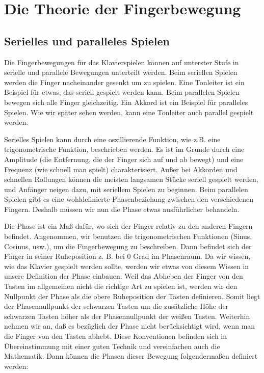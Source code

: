 
\section{Die Theorie der Fingerbewegung}\hypertarget{c1iv2}{}

\subsection{Serielles und paralleles Spielen}\hypertarget{c1iv2a}{}

Die Fingerbewegungen für das Klavierspielen können auf unterster Stufe in serielle und parallele Bewegungen unterteilt werden.
Beim seriellen Spielen werden die Finger nacheinander gesenkt um zu spielen.
Eine Tonleiter ist ein Beispiel für etwas, das seriell gespielt werden kann.
Beim parallelen Spielen bewegen sich alle Finger gleichzeitig.
Ein Akkord ist ein Beispiel für paralleles Spielen.
Wie wir später sehen werden, kann eine Tonleiter auch parallel gespielt werden.

Serielles Spielen kann durch eine oszillierende Funktion, wie z.B. eine trigonometrische Funktion, beschrieben werden.
Es ist im Grunde durch eine Amplitude (die Entfernung, die der Finger sich auf und ab bewegt) und eine Frequenz (wie schnell man spielt) charakterisiert.
Außer bei Akkorden und schnellen Rollungen können die meisten langsamen Stücke seriell gespielt werden, und Anfänger neigen dazu, mit seriellem Spielen zu beginnen.
Beim parallelen Spielen gibt es eine wohldefinierte Phasenbeziehung zwischen den verschiedenen Fingern.
Deshalb müssen wir nun die Phase etwas ausführlicher behandeln.

Die Phase ist ein Maß dafür, wo sich der Finger relativ zu den anderen Fingern befindet.
Angenommen, wir benutzen die trigonometrischen Funktionen (Sinus, Cosinus, usw.), um die Fingerbewegung zu beschreiben.
Dann befindet sich der Finger in seiner Ruheposition z. B. bei 0 Grad im Phasenraum.
Da wir wissen, wie das Klavier gespielt werden sollte, werden wir etwas von diesem Wissen in unsere Definition der Phase einbauen.
Weil das Abheben der Finger von den Tasten im allgemeinen nicht die richtige Art zu spielen ist, werden wir den Nullpunkt der Phase als die obere Ruheposition der Tasten definieren.
Somit liegt der Phasennullpunkt der schwarzen Tasten um die zusätzliche Höhe der schwarzen Tasten höher als der Phasennullpunkt der weißen Tasten.
Weiterhin nehmen wir an, daß es bezüglich der Phase nicht berücksichtigt wird, wenn man die Finger von den Tasten abhebt.
Diese Konventionen befinden sich in Übereinstimmung mit einer guten Technik und vereinfachen auch die Mathematik.
Dann können die Phasen dieser Bewegung folgendermaßen definiert werden:

